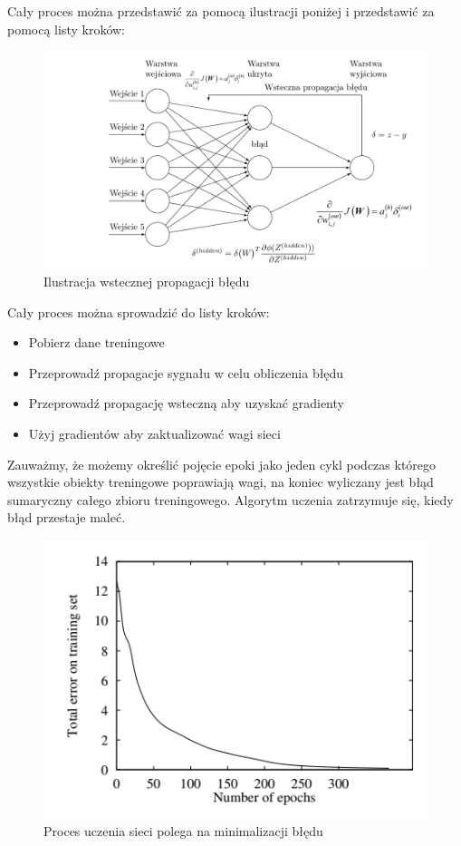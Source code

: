 	Cały proces można przedstawić za pomocą ilustracji poniżej i przedstawić za pomocą listy kroków:
		
	\begin{figure}[H]
		\centering
		\includegraphics[width=0.9\linewidth]{backprop}
		\caption{Ilustracja wstecznej propagacji błędu}
		\label{fig:backprop.png}
	\end{figure}
	Cały proces można sprowadzić do listy kroków:
	\begin{itemize}
		\item Pobierz dane treningowe
		\item Przeprowadź propagacje sygnału w celu obliczenia błędu
		\item Przeprowadź propagację wsteczną aby uzyskać gradienty
		\item Użyj gradientów aby zaktualizować wagi sieci
	\end{itemize}


	\begin{fact}
	Zauważmy, że możemy określić pojęcie epoki jako jeden cykl podczas którego wszystkie obiekty treningowe poprawiają wagi, na koniec wyliczany jest błąd sumaryczny całego zbioru treningowego. Algorytm uczenia zatrzymuje się, kiedy błąd przestaje maleć.
	\end{fact}

	\begin{figure}[H]
		\centering
		\includegraphics[width=0.7\linewidth]{epoki}
		\caption{Proces uczenia sieci polega na minimalizacji błędu}
		\label{fig:epoki}
	\end{figure}
	
